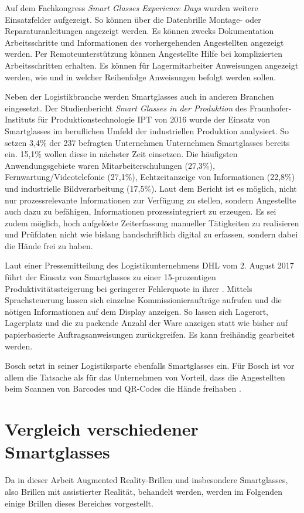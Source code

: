 Auf dem Fachkongress \emph{Smart Glasses Experience Days} \cite{Manokaran-Pathamathan2017} wurden weitere Einsatzfelder aufgezeigt. So können über die Datenbrille Montage- oder Reparaturanleitungen angezeigt werden. Es können zwecks Dokumentation Arbeitsschritte und Informationen des vorhergehenden Angestellten angezeigt werden. Per Remoteunterstützung können Angestellte Hilfe bei komplizierten Arbeitsschritten erhalten. Es können für Lagermitarbeiter Anweisungen angezeigt werden, wie und in welcher Reihenfolge Anweisungen befolgt werden sollen.

Neben der Logistikbranche werden Smartglasses auch in anderen Branchen eingesetzt. Der Studienbericht \emph{Smart Glasses in der Produktion} des Fraunhofer-Instituts für Produktionstechnologie IPT von 2016 \cite{Plutz} wurde der Einsatz von Smartglasses im beruflichen Umfeld der industriellen Produktion analysiert. So setzen 3,4\% der 237 befragten Unternehmen Unternehmen Smartglasses bereits ein. 15,1\% wollen diese in nächster Zeit einsetzen. Die häufigsten Anwendungsgebiete waren Mitarbeiterschulungen (27,3\%), Fernwartung/Videotelefonie (27,1\%), Echtzeitanzeige von Informationen (22,8\%) und industrielle Bildverarbeitung (17,5\%). Laut dem Bericht ist es möglich, nicht nur 
prozessrelevante Informationen zur Verfügung zu stellen, sondern Angestellte auch dazu zu befähigen, Informationen prozessintegriert zu erzeugen. Es sei zudem möglich, hoch aufgelöste Zeiterfassung manueller Tätigkeiten zu realisieren und Prüfdaten nicht wie bislang handschriftlich digital zu erfassen, sondern dabei die Hände frei zu haben.

Laut einer Pressemitteilung des Logistikunternehmens DHL vom 2. August 2017 führt der Einsatz von Smartglasses zu einer 15-prozentigen Produktivitätssteigerung bei geringerer Fehlerquote in ihrer \cite{DeutschePostDHLGroup2017}. Mittels Sprachsteuerung lassen sich einzelne Kommissionieraufträge aufrufen und die nötigen Informationen auf dem Display anzeigen. So lassen sich Lagerort, Lagerplatz und die zu packende Anzahl der Ware anzeigen statt wie bisher auf papierbasierte Auftragsanweisungen zurückgreifen. Es kann freihändig gearbeitet werden.

Bosch setzt in seiner Logistiksparte ebenfalls Smartglasses ein. Für Bosch ist vor allem die Tatsache als für das Unternehmen von Vorteil, dass die Angestellten beim Scannen von Barcodes und QR-Codes die Hände freihaben \cite{Spinger2014}. 
%
%
\section{Vergleich verschiedener Smartglasses}
\label{sec:VergleichSmartglasses}
Da in dieser Arbeit Augmented Reality-Brillen und insbesondere Smartglasses, also Brillen mit assistierter Realität, behandelt werden, werden im Folgenden einige Brillen dieses Bereiches vorgestellt.
%

